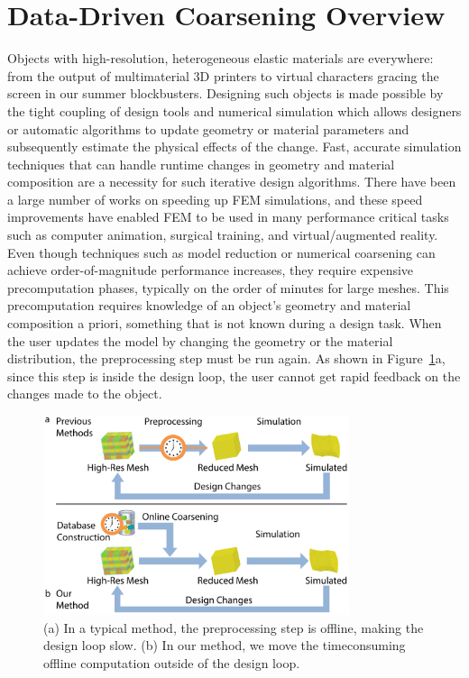 \section{Data-Driven Coarsening Overview}
Objects with high-resolution, heterogeneous elastic materials are everywhere:
from the output of multimaterial 3D printers to virtual characters 
gracing the screen in our summer blockbusters.
Designing such objects is made possible by the tight coupling of design
tools and numerical simulation which allows designers or automatic
algorithms to update geometry or material parameters and subsequently
estimate the physical effects of the change.
Fast, accurate simulation techniques that can handle runtime changes in geometry
and material composition are a necessity for such iterative design algorithms.
There have been a large number of works on speeding up FEM simulations,
and these speed improvements have enabled FEM to be used in many performance critical tasks 
such as computer animation, surgical training, and virtual/augmented reality.
Even though techniques such as model reduction or numerical coarsening can
achieve order-of-magnitude performance increases,
they require expensive precomputation phases, typically on the order of minutes for large meshes.
This precomputation requires knowledge of an
object's geometry and material composition a priori, something
that is not known during a design task.
When the user updates the model by changing the geometry or the material distribution,
the preprocessing step must be run again.
As shown in Figure~\ref{fig:typical}a, since this step is inside the design loop,
the user cannot get rapid feedback on the changes made to the object.
\begin{figure}
	\centering
	\includegraphics[width=0.8\textwidth]{figs/typical1.pdf}
	\caption{(a) In a typical method, the preprocessing step is offline,
		making the design loop slow. (b) In our method, we move the timeconsuming
		offline computation outside of the design loop.}
	\label{fig:typical}
\end{figure}

